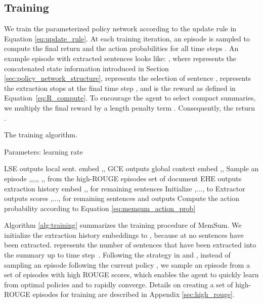 \documentclass[11pt]{article}
\begin{document}
\subsection{Training}
\label{sec:training}
We train the parameterized policy network according to the update rule in Equation \eqref{eq:update_rule}. At each training iteration, an episode is sampled to compute the final return  and the action probabilities  for all time steps . An example episode with  extracted sentences looks like: , where  represents the concatenated state information introduced in Section \ref{sec:policy_network_structure},  represents the selection of sentence ,  represents the extraction stops at the final time step , and  is the reward as defined in Equation~\eqref{eq:R_compute}. To encourage the agent to select compact summaries, we multiply the final reward  by a length penalty term   \cite{luo2019reading}. Consequently, the return .
\begin{algorithm}
\caption{The training algorithm.}
\label{alg:training}
Parameters: learning rate 
\begin{algorithmic}[1]
    \State LSE outputs local sent. embed ,,
    \State GCE outputs global context embed ,,
    \State Sample an episode ,,,,, ,, from the high-ROUGE episodes set  of document  
        \If{}
            \State EHE outputs extraction history embed ,, for remaining sentences
        \Else
               \State Initialize ,..., to 
        \EndIf
        \State Extractor outputs scores ,..., for remaining sentences and outputs 
        \State Compute the action probability  according to Equation \eqref{eq:memsum_action_prob}
        \State 
    \EndFor
\EndFor
\end{algorithmic}
\end{algorithm}

Algorithm \ref{alg:training} summarizes the training procedure of MemSum. 
We initialize the extraction history embeddings to , because at  no sentences have been extracted.  represents the number of sentences that have been extracted into the summary up to time step~. Following the strategy in \citet{narayan2018ranking} and \citet{mohsen2020hierarchical}, instead of sampling an episode following the current policy , we sample an episode from a set  of episodes with high ROUGE scores, which enables the agent to quickly learn from optimal policies and to rapidly converge. Details on creating a set of high-ROUGE episodes for training are described in Appendix \ref{sec:high_rouge}.
\end{document}

